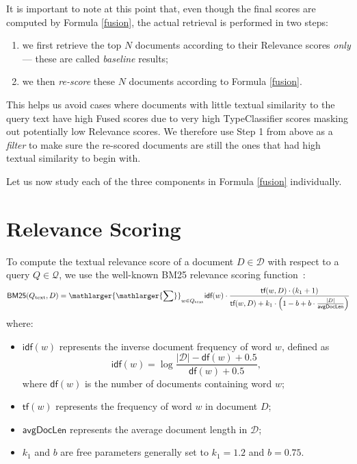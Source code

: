 It is important to note at this point that, even though the final scores are computed by Formula \ref{fusion},
the actual retrieval is performed in two steps:
\begin{enumerate}
 \item we first retrieve the top $N$ documents according to their \textsf{Relevance} scores \emph{only} --- these are called
 \emph{baseline} results;
 \vspace{-0.2cm}
 \item we then \emph{re-score} these $N$ documents according to Formula \ref{fusion}.
\end{enumerate}
This helps us avoid cases where documents with little textual similarity to the query text
have high \textsf{Fused} scores due to very high \textsf{TypeClassifier} scores masking out potentially low \textsf{Relevance} scores.
We therefore use Step 1 from above as a \emph{filter} to make sure the re-scored documents are still the ones that had high textual
similarity to begin with.

Let us now study each of the three components in Formula \ref{fusion} individually.

\section{Relevance Scoring}
To compute the textual relevance score of a document $D\in\mathcal{D}$ with respect to a query $Q\in\mathcal{Q}$,
we use the well-known BM25 relevance scoring function~\cite{bm25}:
\begin{equation}\label{bm25-formula}
\textsf{BM25}(Q_{\text{text}},D)
 = \displaystyle\mathlarger{\mathlarger{\sum}}_{w\in Q_{\text{text}}} \textsf{idf}(w)\cdot\displaystyle\frac{\textsf{tf}(w,D)\cdot(k_1+1)}{\textsf{tf}(w,D)+k_1\cdot\left(1-b+b\cdot\frac{|D|}{\textsf{avgDocLen}}\right)}
\end{equation}
where:
\begin{itemize}
 \item $\textsf{idf}(w)$ represents the inverse document frequency of word $w$, defined as
\[\textsf{idf}(w) = \log \displaystyle\frac{|\mathcal{D}|-\textsf{df}(w)+0.5}{\textsf{df}(w)+0.5},\]
where $\textsf{df}(w)$ is the number of documents containing word $w$;
\item $\textsf{tf}(w)$ represents the frequency of word $w$ in document $D$;
\item $\textsf{avgDocLen}$ represents the average document length in $\mathcal{D}$;
\item $k_1$ and $b$ are free parameters generally set to $k_1=1.2$ and $b=0.75$.
\end{itemize}

